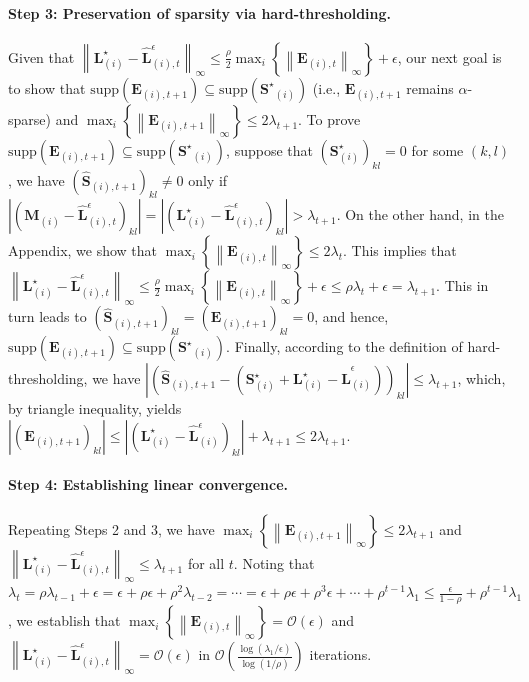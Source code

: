 \documentclass[twoside,11pt]{article}
\newcommand{\norm}[1]{\left\lVert#1\right\rVert}
\newcommand{\supp}[1]{\text{supp}\left(#1\right)}
\newcommand{\matE}{\mathbf{E}}
\newcommand{\matL}{\mathbf{L}}
\newcommand{\matM}{\mathbf{M}}
\newcommand{\matS}{\mathbf{S}}
\newcommand{\matSst}{{\mathbf{S}^\star}}
\newcommand{\hmatLeps}{\hat{\mathbf{L}}^{\epsilon}}
\newcommand{\hmatS}{\hat{\mathbf{S}}}
\begin{document}
\paragraph{Step 3: Preservation of sparsity via hard-thresholding.} Given that $\norm{\matL^\star_{(i)}-\hmatLeps_{(i),t}}_{\infty}\leq \frac{\rho}{2}\max_i\left\{\norm{\matE_{(i),t}}_{\infty}\right\}+\epsilon$, our next goal is to show that $\supp{\matE_{(i),t+1}}\subseteq\supp{\matSst_{(i)}}$ (i.e., $\matE_{(i),t+1}$ remains $\alpha$-sparse) and $\max_i\left\{\norm{\matE_{(i),t+1}}_{\infty}\right\}\leq  2\lambda_{t+1}$. To prove $\supp{\matE_{(i),t+1}}\subseteq\supp{\matSst_{(i)}}$, suppose that $\left(\matS_{(i)}^\star\right)_{kl}=0$ for some $(k,l)$, we have $\left(\hmatS_{(i), t+1}\right)_{kl}\not=0$ only if $\left|\left(\matM_{(i)}-\hmatLeps_{(i),t}\right)_{kl}\right|=\left|\left(\matL_{(i)}^\star-\hmatLeps_{(i),t}\right)_{kl}\right|>\lambda_{t+1}$.
On the other hand, in the Appendix, we show that $\max_i\left\{\norm{\matE_{(i),t}}_{\infty}\right\}\leq 2\lambda_t$. This implies that $\norm{\matL^\star_{(i)}-\hmatLeps_{(i),t}}_{\infty}\leq \frac{\rho}{2}\max_i\left\{\norm{\matE_{(i),t}}_{\infty}\right\}+\epsilon \leq \rho\lambda_t+\epsilon = \lambda_{t+1}$. This in turn leads to $\left(\hmatS_{(i), t+1}\right)_{kl}=\left(\matE_{(i), t+1}\right)_{kl}=0$, and hence, $\supp{\matE_{(i),t+1}}\subseteq\supp{\matSst_{(i)}}$. Finally, according to the definition of hard-thresholding, we have $\left|\left(\hmatS_{(i),t+1}-\left(\matS^\star_{(i)}+\matL^\star_{(i)}-\hmatLeps_{(i)}\right)\right)_{kl}\right|\leq \lambda_{t+1}$, which, by triangle inequality, yields $\left|\left(\matE_{(i),t+1}\right)_{kl}\right|\leq \left|\left(\matL^\star_{(i)}-\hmatLeps_{(i)}\right)_{kl}\right|+\lambda_{t+1}\leq 2\lambda_{t+1}$.

\paragraph{Step 4: Establishing linear convergence.} Repeating Steps 2 and 3, we have $\max_i\left\{\norm{\matE_{(i),t+1}}_{\infty}\right\}\leq 2\lambda_{t+1}$ and $\norm{\matL^\star_{(i)}-\hmatLeps_{(i),t}}_{\infty}\leq\lambda_{t+1}$ for all $t$. Noting that $\lambda_t = \rho\lambda_{t-1}+\epsilon = \epsilon+\rho\epsilon + \rho^2\lambda_{t-2}=\cdots = \epsilon+\rho\epsilon+\rho^3\epsilon+\cdots + \rho^{t-1}\lambda_1\leq \frac{\epsilon}{1-\rho} + \rho^{t-1}\lambda_1$, we establish that $\max_i\left\{\norm{\matE_{(i),t}}_{\infty}\right\} = \mathcal{O}(\epsilon)$ and $\norm{\matL^\star_{(i)}-\hmatLeps_{(i),t}}_{\infty} = \mathcal{O}(\epsilon)$ in $\mathcal{O}\left(\frac{\log(\lambda_1/\epsilon)}{\log(1/\rho)}\right)$ iterations.
\end{document}
